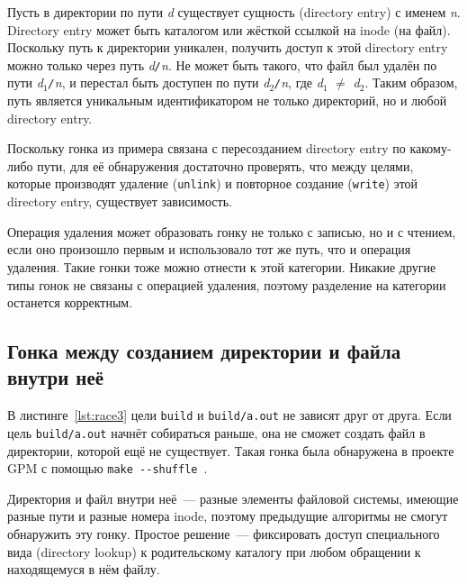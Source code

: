 Пусть в директории по пути \textit{d} существует сущность (directory entry) с именем \textit{n}. Directory entry может быть каталогом или жёсткой ссылкой на inode (на файл). Поскольку путь к директории уникален, получить доступ к этой directory entry можно только через путь \textit{d\texttt{/}n}. Не может быть такого, что файл был удалён по пути \textit{d$_1$\texttt{/}n}, и перестал быть доступен по пути \textit{d$_2$\texttt{/}n}, где \textit{d}$_1$ $\ne$ \textit{d}$_2$. Таким образом, путь является уникальным идентификатором не только директорий, но и любой directory entry.

Поскольку гонка из примера связана с пересозданием directory entry по какому-либо пути, для её обнаружения достаточно проверять, что между целями, которые производят удаление (\texttt{unlink}) и повторное создание (\texttt{write}) этой directory entry, существует зависимость.

Операция удаления может образовать гонку не только с записью, но и с чтением, если оно произошло первым и использовало тот же путь, что и операция удаления. Такие гонки тоже можно отнести к этой категории. Никакие другие типы гонок не связаны с операцией удаления, поэтому разделение на категории останется корректным.

\subsection{Гонка между созданием директории и файла внутри неё}
\label{subsec:dir-race}

\begin{figure}[H]

\end{figure}

В листинге~\ref{lst:race3} цели \texttt{build} и \texttt{build/a.out} не зависят друг от друга. Если цель \texttt{build/a.out} начнёт собираться раньше, она не сможет создать файл в директории, которой ещё не существует. Такая гонка была обнаружена в проекте GPM с помощью \texttt{make -{}-shuffle}~\cite{race-3-example}.

Директория и файл внутри неё~--- разные элементы файловой системы, имеющие разные пути и разные номера inode, поэтому предыдущие алгоритмы не смогут обнаружить эту гонку. Простое решение~--- фиксировать доступ специального вида (directory lookup) к родительскому каталогу при любом обращении к находящемуся в нём файлу.

